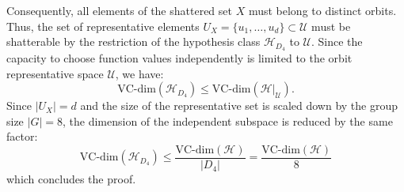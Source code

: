 \documentclass{article}
\begin{document}
Consequently, all elements of the shattered set $X$ must belong to distinct orbits. Thus, the set of representative elements $U_X = \{u_1, \dots, u_d\} \subset \mathcal{U}$ must be shatterable by the restriction of the hypothesis class $\mathcal{H}_{D_4}$ to $\mathcal{U}$. Since the capacity to choose function values independently is limited to the orbit representative space $\mathcal{U}$, we have:
\begin{equation}
    \mathrm{VC}\text{-}\mathrm{dim}(\mathcal{H}_{D_4}) \leq \mathrm{VC}\text{-}\mathrm{dim}(\mathcal{H}|_{\mathcal{U}}).
\end{equation}
Since $|U_X| = d$ and the size of the representative set is scaled down by the group size $|G| = 8$, the dimension of the independent subspace is reduced by the same factor:
\begin{equation}
    \mathrm{VC}\text{-}\mathrm{dim}(\mathcal{H}_{D_4}) \leq \frac{\mathrm{VC}\text{-}\mathrm{dim}(\mathcal{H})}{|D_4|} = \frac{\mathrm{VC}\text{-}\mathrm{dim}(\mathcal{H})}{8}
\end{equation}
which concludes the proof.
\end{document}
